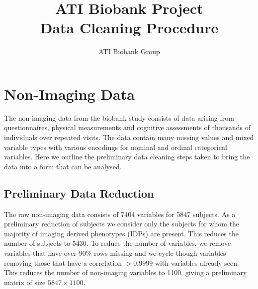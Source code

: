 \documentclass{article}
\begin{document}
\title{ATI Biobank Project \\ Data Cleaning Procedure}

\author{ATI Biobank Group}
\maketitle


\section{Non-Imaging Data}
The non-imaging data from the biobank study consists of data arising from questionnaires, physical measurements and cognitive assessments of thousands of individuals over repeated visits. The data contain many missing values and mixed variable types with various encodings for nominal and ordinal categorical variables. Here we outline the preliminary data cleaning steps taken to bring the data into a form that can be analysed.


\subsection*{Preliminary Data Reduction}
The raw non-imaging data consists of 7404 variables for 5847 subjects. As a preliminary reduction of subjects we consider only the subjects for whom the majority of imaging derived phenotypes (IDPs) are present. This reduces the number of subjects to 5430. To reduce the number of variables, we remove variables that have over 90\% rows missing and we cycle though variables removing those that have a correlation $>0.9999$ with variables already seen. This reduces the number of non-imaging variables to 1100, giving a preliminary matrix of size $5847 \times 1100$.
\end{document}
